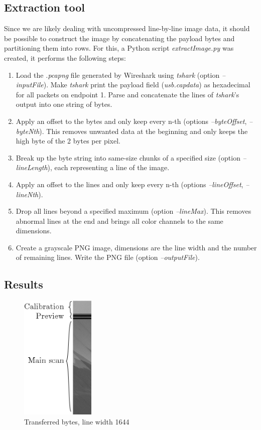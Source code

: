 \documentclass{article}
\begin{document}
\subsection{Extraction tool}

Since we are likely dealing with uncompressed line-by-line image data,
it should be possible to construct the image by concatenating the payload bytes
and partitioning them into rows. For this, a Python script {\it extractImage.py} was created,
it performs the following steps:

\begin{enumerate}
  \item Load the {\it .pcapng} file generated by Wireshark using {\it tshark} (option {\it --inputFile}).
        Make {\it tshark} print the payload field ({\it usb.capdata}) as hexadecimal for all
        packets on endpoint 1. Parse and concatenate the lines of {\it tshark}'s output into
        one string of bytes.
  
  \item Apply an offset to the bytes and only keep every n-th (options {\it --byteOffset}, {\it --byteNth}).
        This removes unwanted data at the beginning and only keeps the high byte of the 2 bytes per pixel.
  
  \item Break up the byte string into same-size chunks of a specified size (option {\it --lineLength}),
        each representing a line of the image.

  \item Apply an offset to the lines and only keep every n-th (options {\it --lineOffset}, {\it --lineNth}).
  
  \item Drop all lines beyond a specified maximum (option {\it --lineMax}). This removes abnormal lines at the
        end and brings all color channels to the same dimensions.

  \item Create a grayscale PNG image, dimensions are the line width and the number of remaining lines.
        Write the PNG file (option {\it --outputFile}).
\end{enumerate}

\subsection{Results}

\begin{figure}[H]
  \caption{Transferred bytes, line width 1644}
  \centering
  \includegraphics[height=6cm]{images/extract_1.jpg}
\end{figure}
\end{document}
